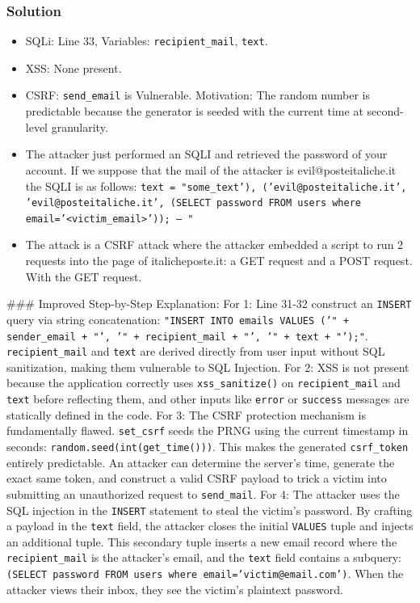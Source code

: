 \documentclass{article}
\begin{document}
\subsubsection*{Solution}
\begin{itemize}
    \item[\textbf{1.}] SQLi: Line 33, Variables: \texttt{recipient\_mail}, \texttt{text}.
    \item[\textbf{2.}] XSS: None present.
    \item[\textbf{3.}] CSRF: \texttt{send\_email} is Vulnerable. Motivation: The random number is predictable because the generator is seeded with the current time at second-level granularity.
    \item[\textbf{4.}] The attacker just performed an SQLI and retrieved the password of your account. If we suppose that the mail of the attacker is evil@posteitaliche.it the SQLI is as follows: \texttt{text = "some\_text'), ('evil@posteitaliche.it', 'evil@posteitaliche.it', (SELECT password FROM users where email='<victim\_email>')); -- "}
    \item[\textbf{5.}] The attack is a CSRF attack where the attacker embedded a script to run 2 requests into the page of italicheposte.it: a GET request and a POST request. With the GET request.

\end{itemize}
\#\#\# Improved Step-by-Step Explanation:
For 1: Line 31-32 construct an \texttt{INSERT} query via string concatenation: \texttt{"INSERT INTO emails VALUES ('" + sender\_email + "', '" + recipient\_mail + "', '" + text + "');"}. \texttt{recipient\_mail} and \texttt{text} are derived directly from user input without SQL sanitization, making them vulnerable to SQL Injection.
For 2: XSS is not present because the application correctly uses \texttt{xss\_sanitize()} on \texttt{recipient\_mail} and \texttt{text} before reflecting them, and other inputs like \texttt{error} or \texttt{success} messages are statically defined in the code.
For 3: The CSRF protection mechanism is fundamentally flawed. \texttt{set\_csrf} seeds the PRNG using the current timestamp in seconds: \texttt{random.seed(int(get\_time()))}. This makes the generated \texttt{csrf\_token} entirely predictable. An attacker can determine the server's time, generate the exact same token, and construct a valid CSRF payload to trick a victim into submitting an unauthorized request to \texttt{send\_mail}.
For 4: The attacker uses the SQL injection in the \texttt{INSERT} statement to steal the victim's password. By crafting a payload in the \texttt{text} field, the attacker closes the initial \texttt{VALUES} tuple and injects an additional tuple. This secondary tuple inserts a new email record where the \texttt{recipient\_mail} is the attacker's email, and the \texttt{text} field contains a subquery: \texttt{(SELECT password FROM users where email='victim@email.com')}. When the attacker views their inbox, they see the victim's plaintext password.
\end{document}
